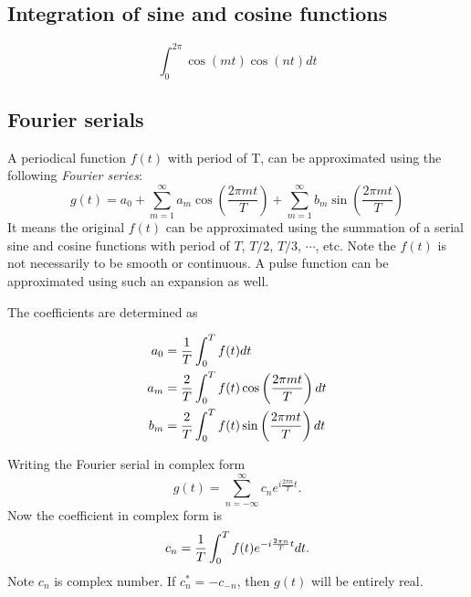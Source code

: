 \documentclass[11pt]{amsart}
\begin{document}
\subsection{Integration of sine and cosine functions}

\begin{equation}
\int_0^{2\pi}\cos (mt) \cos (nt)  dt 
\end{equation}

\subsection{Fourier serials}
A periodical function $f(t)$ with period of T, can be approximated using the following \emph{Fourier series}:
\begin{equation}
g(t) = a_0 + \sum_{m=1}^{\infty} a_m\cos \left(\frac{2\pi m t}{T}\right )  + \sum_{m=1}^{\infty} b_m\sin \left(\frac{2\pi m t}{T}\right )
\end{equation}
It means the original $f(t)$ can be approximated using the summation of a serial sine and cosine functions with period of $T$, $T/2$, $T/3$, $\cdots$, etc. 
Note the $f(t)$ is not necessarily to be smooth or continuous. A pulse function can be approximated using such an expansion as well.


The coefficients are determined as

\begin{align}
\begin{split}
a_0 & = {1\over T}\int_0^T f(t)dt \\
a_m &= {2\over T}\int_0^T f(t) \cos \left(\frac{2\pi m t}{T}\right )  dt  \\
b_m &= {2\over T}\int_0^T f(t) \sin \left(\frac{2\pi m t}{T}\right )  dt 
\end{split}
\end{align}

Writing the Fourier serial in complex form
\begin{equation}
g(t) = \sum_{n = -\infty}^{\infty} c_n e^{i\frac{2\pi n}{T}t}.
\end{equation}
Now the coefficient in complex form is
\begin{equation}
c_n = {1\over T}\int_0^T f(t) e^{-i\frac{2\pi n}{T}t}dt.
\end{equation}
Note $c_n$ is complex number. If $c^*_n = -c_{-n}$, then $g(t)$ will be entirely real. 
\end{document}
